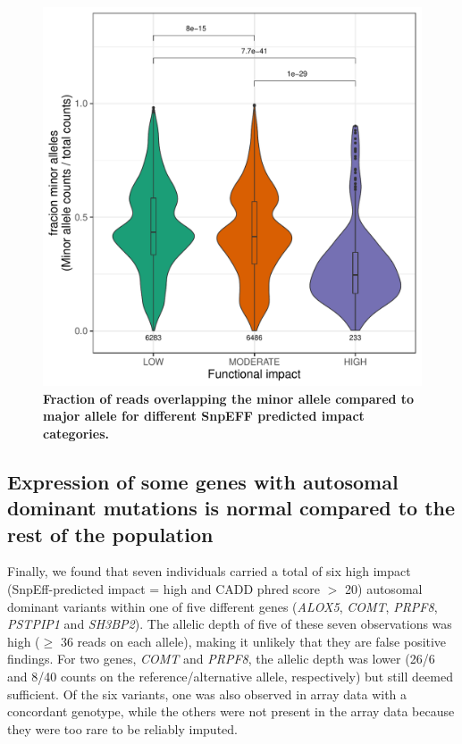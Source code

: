 \begin{figure}[h!]
	\includegraphics[width=\textwidth]{chapters/chapter3-allele-specific-expression/img/fig4.pdf}
	\caption{\textbf{Fraction of reads overlapping the minor allele compared to major allele for different SnpEFF predicted impact categories.}}
	\label{ase_fig4}
\end{figure}



\subsection{Expression of some genes with autosomal dominant mutations is normal compared to the rest of the population}
Finally, we found that seven individuals carried a total of six high impact (SnpEff-predicted impact = high and CADD phred score $>$ 20) autosomal dominant variants within one of five different genes (\textit{ALOX5}, \textit{COMT}, \textit{PRPF8}, \textit{PSTPIP1} and \textit{SH3BP2}). The allelic depth of five of these seven observations was high ($\geq$ 36 reads on each allele), making it unlikely that they are false positive findings. For two genes, \textit{COMT} and \textit{PRPF8}, the allelic depth was lower (26/6 and 8/40 counts on the reference/alternative allele, respectively) but still deemed sufficient. Of the six variants, one was also observed in array data with a concordant genotype, while the others were not present in the array data because they were too rare to be reliably imputed. 

